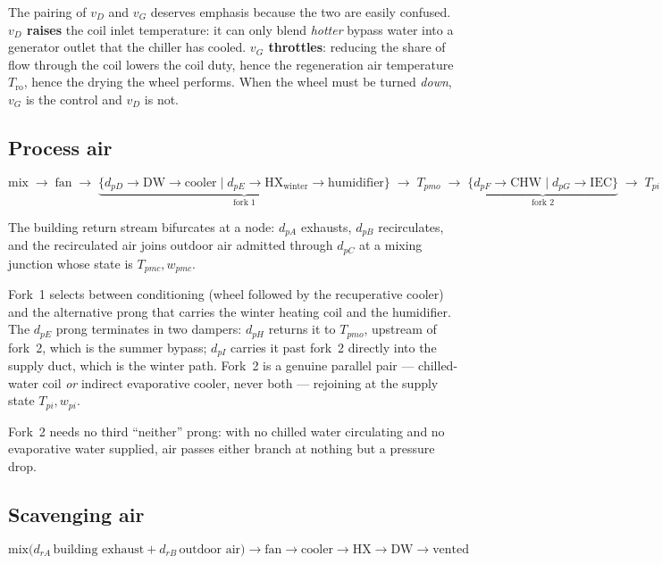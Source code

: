 \documentclass[11pt]{article}
\begin{document}
The pairing of $v_D$ and $v_G$ deserves emphasis because the two are easily
confused. \textbf{$v_D$ raises} the coil inlet temperature: it can only blend
\emph{hotter} bypass water into a generator outlet that the chiller has cooled.
\textbf{$v_G$ throttles}: reducing the share of flow through the coil lowers
the coil duty, hence the regeneration air temperature $T_{\mathrm{ro}}$, hence
the drying the wheel performs. When the wheel must be turned \emph{down},
$v_G$ is the control and $v_D$ is not.

\subsection{Process air}

\begin{equation*}
\text{mix} \;\to\; \text{fan} \;\to\;
\underbrace{\Big\{ d_{pD} \to \mathrm{DW} \to \mathrm{cooler}
\;\Big|\; d_{pE} \to \mathrm{HX_{winter}} \to \mathrm{humidifier} \Big\}}_{\text{fork 1}}
\;\to\; T_{pmo} \;\to\;
\underbrace{\Big\{ d_{pF} \to \mathrm{CHW} \;\Big|\; d_{pG} \to \mathrm{IEC} \Big\}}_{\text{fork 2}}
\;\to\; T_{pi}
\end{equation*}

The building return stream bifurcates at a node: $d_{pA}$ exhausts,
$d_{pB}$ recirculates, and the recirculated air joins outdoor air admitted
through $d_{pC}$ at a mixing junction whose state is $T_{pmc}, w_{pmc}$.

Fork~1 selects between conditioning (wheel followed by the recuperative
cooler) and the alternative prong that carries the winter heating coil and the
humidifier. The $d_{pE}$ prong terminates in two dampers: $d_{pH}$ returns it
to $T_{pmo}$, upstream of fork~2, which is the summer bypass; $d_{pI}$ carries
it past fork~2 directly into the supply duct, which is the winter path. Fork~2
is a genuine parallel pair --- chilled-water coil \emph{or} indirect
evaporative cooler, never both --- rejoining at the supply state
$T_{pi}, w_{pi}$.

Fork~2 needs no third ``neither'' prong: with no chilled water circulating and
no evaporative water supplied, air passes either branch at nothing but a
pressure drop.

\subsection{Scavenging air}

\begin{equation*}
\text{mix}\big(d_{rA}\,\text{building exhaust} + d_{rB}\,\text{outdoor air}\big)
\to \text{fan} \to \text{cooler} \to \mathrm{HX} \to \mathrm{DW} \to \text{vented}
\end{equation*}
\end{document}
